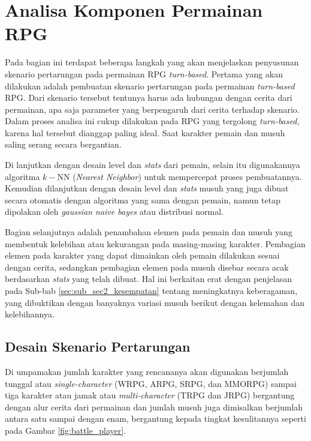 \section{Analisa Komponen Permainan RPG}
\label{sec:sec3_design_komponen}
\vspace{1ex}

Pada bagian ini terdapat beberapa langkah yang akan menjelaskan penyusunan skenario pertarungan pada permainan RPG \textit{turn-based}. Pertama yang akan dilakukan adalah pembuatan skenario pertarungan pada permainan \textit{turn-based} RPG. Dari skenario tersebut tentunya harus ada hubungan dengan cerita dari permainan, apa saja parameter yang berpengaruh dari cerita terhadap skenario. Dalam proses analisa ini cukup dilakukan pada RPG yang tergolong \textit{turn-based}, karena hal tersebut dianggap paling ideal. Saat karakter pemain dan musuh saling serang secara bergantian.
\vspace{1ex}

Di lanjutkan dengan desain level dan \textit{stats} dari pemain, selain itu digunakannya algoritma $k-$NN (\textit{Nearest Neighbor}) untuk mempercepat proses pembuatannya. Kemudian dilanjutkan dengan desain level dan \textit{stats} musuh yang juga dibuat secara otomatis dengan algoritma yang sama dengan pemain, namun tetap dipolakan oleh \textit{gaussian naive bayes} atau distribusi normal. 
\vspace{1ex}

Bagian selanjutnya adalah penambahan elemen pada pemain dan musuh yang membentuk kelebihan atau kekurangan pada masing-masing karakter. Pembagian elemen pada karakter yang dapat dimainkan oleh pemain dilakukan sesuai dengan cerita, sedangkan pembagian elemen pada musuh disebar secara acak berdasarkan \textit{stats} yang telah dibuat. Hal ini berkaitan erat dengan penjelasan pada Sub-bab \ref{sec:sub_sec2_kesempatan} tentang meningkatnya keberagaman, yang dibuktikan dengan banyaknya variasi musuh berikut dengan kelemahan dan kelebihannya.
\vspace{1ex}

\subsection{Desain Skenario Pertarungan}
\label{sec:sub_sec3_design_skenario}
\vspace{1ex}

Di umpamakan jumlah karakter yang rencananya akan digunakan berjumlah tunggal atau \textit{single-character} (WRPG, ARPG, SRPG, dan MMORPG) sampai tiga karakter atau jamak atau \textit{multi-character} (TRPG dan JRPG) bergantung dengan alur cerita dari permainan dan jumlah musuh juga dimisalkan berjumlah antara satu sampai dengan enam, bergantung kepada tingkat kesulitannya seperti pada Gambar \ref{fig:battle_player}. 
\vspace{1ex}

